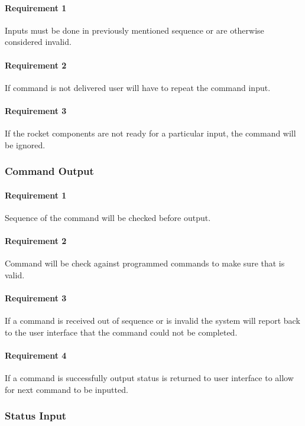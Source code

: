 \documentclass[10pt,draftclsnofoot,onecolumn,compsoc]{IEEEtran}
\begin{document}
	\paragraph{ Requirement 1}Inputs must be done in previously mentioned sequence or are otherwise considered invalid. \par
	\paragraph{ Requirement 2}If command is not delivered user will have to repeat the command input.\par
	\paragraph{ Requirement 3}If the rocket components are not ready for a particular input, the command will be ignored. \par
\subsubsection{Command Output}
	\paragraph{ Requirement 1}Sequence of the command will be checked before output.\par
	\paragraph{ Requirement 2}Command will be check against programmed commands to make sure that is valid.\par
	\paragraph{ Requirement 3}If a command is received out of sequence or is invalid the system will report back to the user interface that the command could not be 	completed.\par
	\paragraph{ Requirement 4}If a command is successfully output status is returned to user interface to allow for next command to be inputted.\par
\subsubsection{Status Input}
\end{document}
